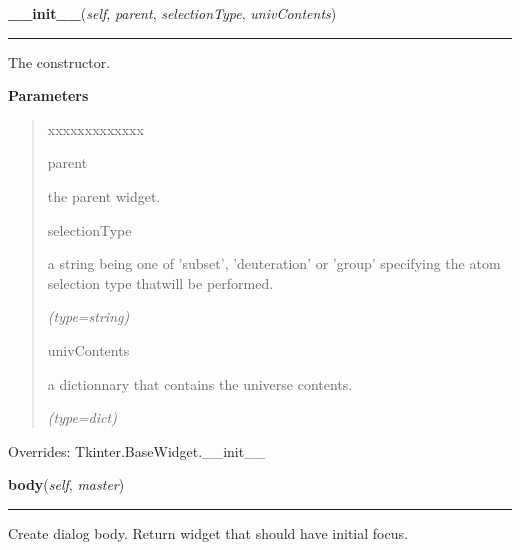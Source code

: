 \hspace{.8\funcindent}\begin{boxedminipage}{\funcwidth}

    \raggedright \textbf{\_\_init\_\_}(\textit{self}, \textit{parent}, \textit{selectionType}, \textit{univContents})

    \vspace{-1.5ex}

    \rule{\textwidth}{0.5\fboxrule}
\setlength{\parskip}{2ex}
    The constructor.

\setlength{\parskip}{1ex}
      \textbf{Parameters}
      \vspace{-1ex}

      \begin{quote}
        \begin{Ventry}{xxxxxxxxxxxxx}

          \item[parent]

          the parent widget.

          \item[selectionType]

          a string being one of 'subset', 'deuteration' or 'group' 
          specifying the atom selection type thatwill be performed.

            {\it (type=string)}

          \item[univContents]

          a dictionnary that contains the universe contents.

            {\it (type=dict)}

        \end{Ventry}

      \end{quote}

      Overrides: Tkinter.BaseWidget.\_\_init\_\_

    \end{boxedminipage}

    \label{nMOLDYN:GUI:SelectionDialog:SelectionDialog:body}

    \vspace{0.5ex}

\hspace{.8\funcindent}\begin{boxedminipage}{\funcwidth}

    \raggedright \textbf{body}(\textit{self}, \textit{master})

    \vspace{-1.5ex}

    \rule{\textwidth}{0.5\fboxrule}
\setlength{\parskip}{2ex}
    Create dialog body. Return widget that should have initial focus.

\setlength{\parskip}{1ex}
    \end{boxedminipage}

